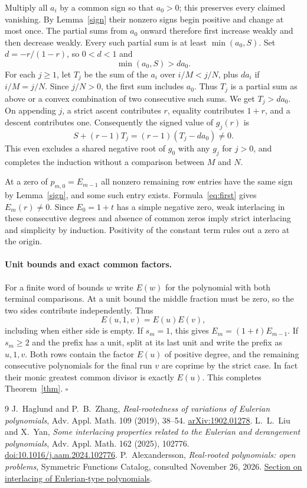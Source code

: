 \documentclass[11pt]{article}
\begin{document}
Multiply all $a_i$ by a common sign so that $a_0>0$; this preserves every claimed vanishing. By Lemma~\ref{sign} their nonzero signs begin positive and change at most once. The partial sums from $a_0$ onward therefore first increase weakly and then decrease weakly. Every such partial sum is at least $\min(a_0,S)$. Set $d=-r/(1-r)$, so $0<d<1$ and
\[
 \min(a_0,S)>d a_0 .
\]
For each $j\ge1$, let $T_j$ be the sum of the $a_i$ over $i/M<j/N$, plus $d a_i$ if $i/M=j/N$. Since $j/N>0$, the first sum includes $a_0$. Thus $T_j$ is a partial sum as above or a convex combination of two consecutive such sums. We get $T_j>d a_0$. On appending $j$, a strict ascent contributes $r$, equality contributes $1+r$, and a descent contributes one. Consequently the signed value of $g_j(r)$ is
\[
 S+(r-1)T_j=(r-1)(T_j-d a_0)\ne0.
\]
This even excludes a shared negative root of $g_0$ with any $g_j$ for $j>0$, and completes the induction without a comparison between $M$ and $N$.

At a zero of $p_{m,0}=E_{m-1}$ all nonzero remaining row entries have the same sign by Lemma~\ref{sign}, and some such entry exists. Formula~\eqref{eq:first} gives $E_m(r)\ne0$. Since $E_0=1+t$ has a simple negative zero, weak interlacing in these consecutive degrees and absence of common zeros imply strict interlacing and simplicity by induction. Positivity of the constant term rules out a zero at the origin.

\paragraph{Unit bounds and exact common factors.}
For a finite word of bounds $w$ write $E(w)$ for the polynomial with both terminal comparisons. At a unit bound the middle fraction must be zero, so the two sides contribute independently. Thus
\[
 E(u,1,v)=E(u)E(v),
\]
including when either side is empty. If $s_m=1$, this gives $E_m=(1+t)E_{m-1}$. If $s_m\ge2$ and the prefix has a unit, split at its last unit and write the prefix as $u,1,v$. Both rows contain the factor $E(u)$ of positive degree, and the remaining consecutive polynomials for the final run $v$ are coprime by the strict case. In fact their monic greatest common divisor is exactly $E(u)$. This completes Theorem~\ref{thm}. \hfill$\square$

\begin{thebibliography}{9}
 J.~Haglund and P.~B.~Zhang, \emph{Real-rootedness of variations of Eulerian polynomials}, Adv. Appl. Math. 109 (2019), 38--54. \href{https://arxiv.org/abs/1902.01278}{arXiv:1902.01278}.
 L.~L.~Liu and X.~Yan, \emph{Some interlacing properties related to the Eulerian and derangement polynomials}, Adv. Appl. Math. 162 (2025), 102776. \href{https://doi.org/10.1016/j.aam.2024.102776}{doi:10.1016/j.aam.2024.102776}.
 P.~Alexandersson, \emph{Real-rooted polynomials: open problems}, Symmetric Functions Catalog, consulted November 26, 2026. \href{https://www.symmetricfunctions.com/realRootedOpenProblems.htm}{Section on interlacing of Eulerian-type polynomials}.
\end{thebibliography}
\end{document}
